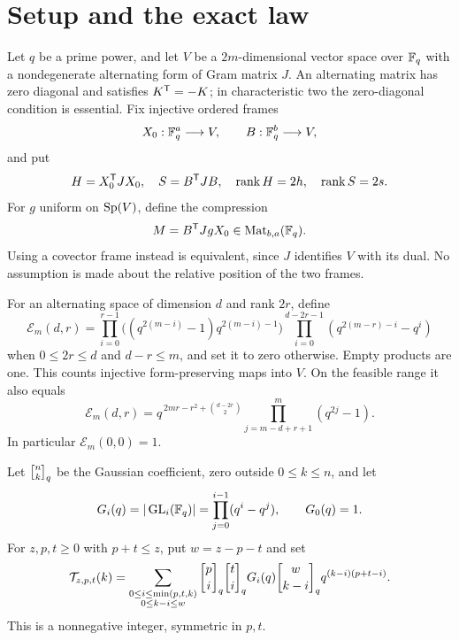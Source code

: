 \section{Setup and the exact law}\label{sec:law}

Let $q$ be a prime power, and let $V$ be a $2m$-dimensional vector space
over $\mathbb F_q$ with a nondegenerate alternating form of Gram matrix $J$.
An alternating matrix has zero diagonal and satisfies $K^{\mathsf T}=-K$;
in characteristic two the zero-diagonal condition is essential.
Fix injective ordered frames
\[
 X_0:\mathbb F_q^a\longrightarrow V,\qquad B:\mathbb F_q^b\longrightarrow V,
\]
and put
\[
 H=X_0^{\mathsf T}JX_0,\quad S=B^{\mathsf T}JB,\quad
 \operatorname{rank} H=2h,\quad\operatorname{rank} S=2s.
\]
For $g$ uniform on $\operatorname{Sp}(V)$, define the compression
\begin{equation}\label{eq:compression}
 M=B^{\mathsf T}JgX_0\in\operatorname{Mat}_{b,a}(\mathbb F_q).
\end{equation}
Using a covector frame instead is equivalent, since $J$ identifies $V$
with its dual. No assumption is made about the relative position of the
two frames.

For an alternating space of dimension $d$ and rank $2r$, define
\begin{equation}\label{eq:E}
 \mathcal E_m(d,r)=
 \prod_{i=0}^{r-1}\bigl((q^{2(m-i)}-1)q^{2(m-i)-1}\bigr)
 \prod_{i=0}^{d-2r-1}(q^{2(m-r)-i}-q^i)
\end{equation}
when $0\le2r\le d$ and $d-r\le m$, and set it to zero otherwise.
Empty products are one. This counts injective form-preserving maps into
$V$. On the feasible range it also equals
\begin{equation}\label{eq:Ecompact}
 \mathcal E_m(d,r)=
 q^{\,2mr-r^2+\binom{d-2r}{2}}
 \prod_{j=m-d+r+1}^{m}(q^{2j}-1).
\end{equation}
In particular $\mathcal E_m(0,0)=1$.

Let $\gb nk$ be the Gaussian coefficient, zero outside $0\le k\le n$,
and let
\[
 G_i(q)=|\operatorname{GL}_i(\mathbb F_q)|=\prod_{j=0}^{i-1}(q^i-q^j),\qquad G_0(q)=1.
\]
For $z,p,t\ge0$ with $p+t\le z$, put $w=z-p-t$ and set
\begin{equation}\label{eq:T}
 \mathcal T_{z,p,t}(k)=
 \sum_{\substack{0\le i\le\min(p,t,k)\\0\le k-i\le w}}
 \gb pi\gb ti G_i(q)\gb w{k-i}
 q^{(k-i)(p+t-i)}.
\end{equation}
This is a nonnegative integer, symmetric in $p,t$.

